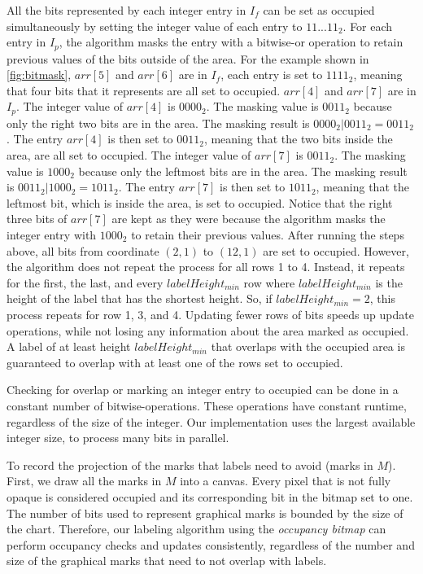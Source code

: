 All the bits represented by each integer entry in $I_f$ can be set as occupied simultaneously by setting the integer value of each entry to $11...11_2$.
For each entry in $I_p$, the algorithm masks the entry with a bitwise-or operation to retain previous values of the bits outside of the area.
For the example shown in \autoref{fig:bitmask}, $arr[5]$ and $arr[6]$ are in $I_f$, each entry is set to $1111_2$, meaning that four bits that it represents are all set to occupied.
$arr[4]$ and $arr[7]$ are in $I_p$.
The integer value of $arr[4]$ is $0000_2$.
The masking value is $0011_2$ because only the right two bits are in the area.
The masking result is $0000_2 | 0011_2 = 0011_2$.
The entry $arr[4]$ is then set to $0011_2$, meaning that the two bits inside the area, are all set to occupied.
The integer value of $arr[7]$ is $0011_2$.
The masking value is $1000_2$ because only the leftmost bits are in the area.
The masking result is $0011_2 | 1000_2 = 1011_2$.
The entry $arr[7]$ is then set to $1011_2$, meaning that the leftmost bit, which is inside the area, is set to occupied.
Notice that the right three bits of $arr[7]$ are kept as they were because the algorithm masks the integer entry with $1000_2$ to retain their previous values.
After running the steps above, all bits from coordinate $(2, 1)$ to $(12, 1)$ are set to occupied.
However, the algorithm does not repeat the process for all rows 1 to 4.
Instead, it repeats for the first, the last, and every $labelHeight_{min}$ row where $labelHeight_{min}$ is the height of the label that has the shortest height.
So, if $labelHeight_{min}=2$, this process repeats for row 1, 3, and 4.
Updating fewer rows of bits speeds up update operations, while not losing any information about the area marked as occupied.
A label of at least height $labelHeight_{min}$ that overlaps with the occupied area is guaranteed to overlap with at least one of the rows set to occupied.

Checking for overlap or marking an integer entry to occupied can be done in a constant number of bitwise-operations.
These operations have constant runtime, regardless of the size of the integer.
Our implementation uses the largest available integer size, to process many bits in parallel.

To record the projection of the marks that labels need to avoid (marks in $M$).
First, we draw all the marks in $M$ into a canvas.
Every pixel that is not fully opaque is considered occupied and its corresponding bit in the bitmap set to one.
The number of bits used to represent graphical marks is bounded by the size of the chart.
Therefore, our labeling algorithm using the \emph{occupancy bitmap} can perform occupancy checks and updates consistently,
regardless of the number and size of the graphical marks that need to not overlap with labels.
